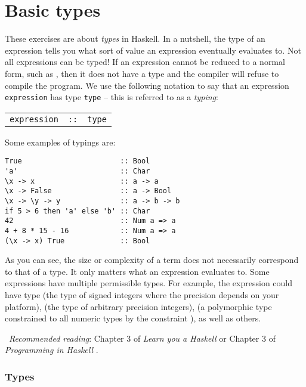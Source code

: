 \section{Basic types}

These exercises are about \emph{types} in Haskell. In a nutshell, the type of an expression tells you what sort of value an expression eventually evaluates to. Not all expressions can be typed! If an expression cannot be reduced to a normal form, such as , then it does not have a type and the compiler will refuse to compile the program. We use the following notation to say that an expression \texttt{\small expression} has type \texttt{\small type} -- this is referred to as a \emph{typing}:
\begin{center}
	\begin{tabular}{lcl}
		\texttt{\small expression} & \texttt{\small ::} & \texttt{\small type}
	\end{tabular}
\end{center}
Some examples of typings are:
\begin{verbatim}
True                       :: Bool
'a'                        :: Char 
\x -> x                    :: a -> a
\x -> False                :: a -> Bool 
\x -> \y -> y              :: a -> b -> b
if 5 > 6 then 'a' else 'b' :: Char 
42                         :: Num a => a
4 + 8 * 15 - 16            :: Num a => a
(\x -> x) True             :: Bool
\end{verbatim}
As you can see, the size or complexity of a term does not necessarily correspond to that of a type. It only matters what an expression evaluates to. Some expressions have multiple permissible types. For example, the expression  could have type  (the type of signed integers where the precision depends on your platform),  (the type of arbitrary precision integers),  (a polymorphic type  constrained to all numeric types by the constraint ), as well as others.

\makebox[0.5cm]{\faBook}~\emph{Recommended reading}: Chapter 3 of \emph{Learn you a Haskell} \citep{lipovaca2011learn} or Chapter 3 of \emph{Programming in Haskell} \citep{hutton2016programming}.

\subsubsection{Types}

